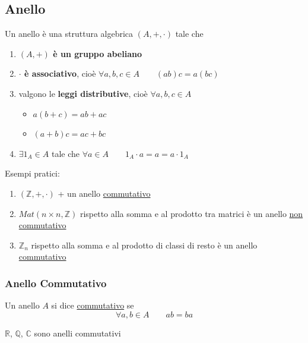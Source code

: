 \documentclass[a4paper,12pt, oneside]{book}
\begin{document}
\subsection{Anello}
\begin{definizione}[Anello]
	Un anello è una struttura algebrica $(A,+, \cdot)$ tale che
	\begin{enumerate}
		\item \textbf{$(A,+)$ è un gruppo abeliano}
		\item \textbf{$\cdot$ è associativo}, cioè $\forall a,b,c \in A \qquad (ab)c=a(bc)$
		\item valgono le \textbf{leggi distributive}, cioè $\forall a,b,c \in A$
		      \begin{itemize}
			      \item $a(b+c)=ab+ac$
			      \item $(a+b)c=ac+bc$
		      \end{itemize}
		\item \textbf{$\exists 1_A \in A$} tale che $\forall a \in A \qquad 1_A \cdot a = a = a \cdot 1_A$
	\end{enumerate}
\end{definizione}

\begin{shaded}
	\begin{esempio}
		Esempi pratici:
		\begin{enumerate}
			\item $(\mathbb{Z}, +, \cdot)$ + un anello \underline{commutativo}
			\item $Mat(n \times n, \mathbb{Z})$ rispetto alla somma e al prodotto tra matrici è un anello \underline{non commutativo}
			\item $\mathbb{Z}_n$ rispetto alla somma e al prodotto di classi di resto è un anello \underline{commutativo}
		\end{enumerate}
	\end{esempio}
\end{shaded}

\subsubsection{Anello Commutativo}
\begin{definizione}
	Un anello $A$ si dice \underline{commutativo} se $$\forall a,b \in A \qquad ab=ba$$
\end{definizione}
\begin{shaded}
	\begin{esempio}
		$\mathbb{R}$, $\mathbb{Q}$, $\mathbb{C}$ sono anelli commutativi
	\end{esempio}
\end{shaded}
\end{document}

